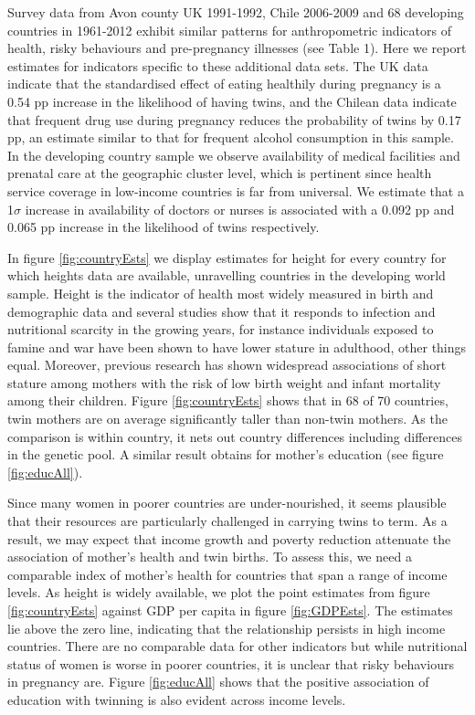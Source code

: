 \documentclass{nature}
\begin{document}
\begin{linenumbers}
Survey data from Avon county UK 1991-1992, Chile 2006-2009 and 68 developing countries in 1961-2012 exhibit similar patterns for anthropometric indicators of health, risky behaviours and pre-pregnancy illnesses (see Table 1). Here we report estimates for indicators specific to these additional data sets. The UK data indicate that the standardised effect of eating healthily during pregnancy is a 0.54 pp increase in the likelihood of having twins, and the Chilean data indicate that frequent drug use during pregnancy reduces the probability of twins by 0.17 pp, an estimate similar to that for frequent alcohol consumption in this sample. In the developing country sample we observe availability of medical facilities and prenatal care at the geographic cluster level, which is pertinent since health service coverage in low-income countries is far from universal. We estimate that a 1$\sigma$ increase in  availability of doctors or nurses is associated with a 0.092 pp and 0.065 pp increase in the likelihood of twins respectively. 

In figure \ref{fig:countryEsts} we display estimates for height for every country for which heights data are available, unravelling countries in the developing world sample. Height is the indicator of health most widely measured in birth and demographic data and several studies show that it responds to infection and nutritional scarcity in the growing years, for instance individuals exposed to famine and war have been shown to have lower stature in adulthood, other things equal\cite{Silventoinen2003,Bozzolietal2009,Wangetal2010,Akreshetal2012}. Moreover, previous research has shown widespread associations of short stature among mothers with the risk of low birth weight and infant mortality among their children\cite{BhalotraRawlings2013}.  Figure \ref{fig:countryEsts} shows that in 68 of 70 countries, twin mothers are on average significantly taller than non-twin mothers. As the comparison is within country, it nets out country differences including differences in the genetic pool. A similar result obtains for mother's education\cite{Kenkel1991,CutlerLlerasMuney2010} (see figure \ref{fig:educAll}).

Since many women in poorer countries are under-nourished, it seems plausible that their resources are particularly challenged in carrying twins to term. As a result, we may expect that income growth and poverty reduction attenuate the association of mother's health and twin births. To assess this, we need a comparable index of mother's health for countries that span a range of income levels. As height is widely available, we plot the point estimates from figure \ref{fig:countryEsts} against GDP per capita in figure \ref{fig:GDPEsts}. The estimates lie above the zero line, indicating that the relationship persists in high income countries. There are no comparable data for other indicators but while nutritional status of women is worse in poorer countries, it is unclear that risky behaviours in pregnancy are. Figure \ref{fig:educAll} shows that the positive association of education with twinning is also evident across income levels. 


\end{linenumbers}
\end{document}
